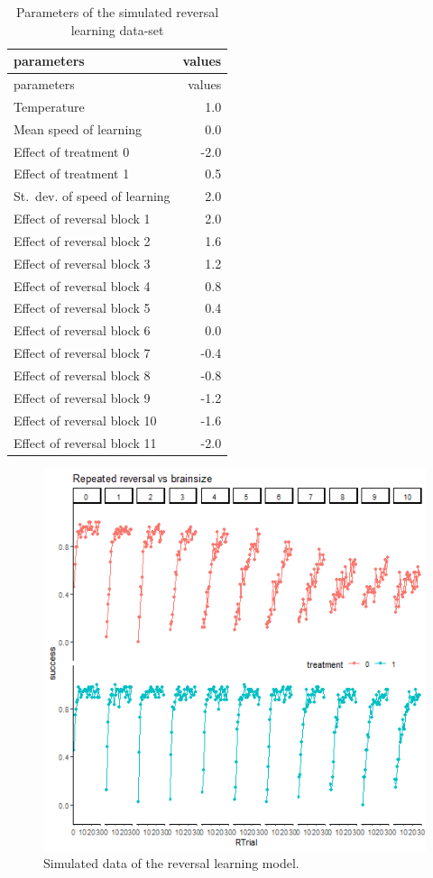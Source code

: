 \documentclass[
]{article}
\begin{document}
\begin{longtable}[]{@{}lr@{}}
\caption{\label{tab:param_rev_meta} Parameters of the simulated reversal
learning data-set}\tabularnewline
\toprule\noalign{}
parameters & values \\
\midrule\noalign{}
\endfirsthead
\toprule\noalign{}
parameters & values \\
\midrule\noalign{}
\endhead
\bottomrule\noalign{}
\endlastfoot
Temperature & 1.0 \\
Mean speed of learning & 0.0 \\
Effect of treatment 0 & -2.0 \\
Effect of treatment 1 & 0.5 \\
St.~dev. of speed of learning & 2.0 \\
Effect of reversal block 1 & 2.0 \\
Effect of reversal block 2 & 1.6 \\
Effect of reversal block 3 & 1.2 \\
Effect of reversal block 4 & 0.8 \\
Effect of reversal block 5 & 0.4 \\
Effect of reversal block 6 & 0.0 \\
Effect of reversal block 7 & -0.4 \\
Effect of reversal block 8 & -0.8 \\
Effect of reversal block 9 & -1.2 \\
Effect of reversal block 10 & -1.6 \\
Effect of reversal block 11 & -2.0 \\
\end{longtable}

\begin{figure}

\includegraphics[width=6.67in,]{images/reversal_data_sim_block} \hfill{}

\caption{Simulated data of the reversal learning model.}\label{fig:rev_sim_data_block}
\end{figure}
\end{document}
